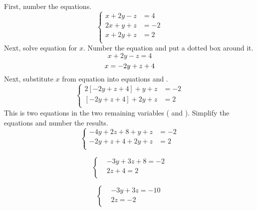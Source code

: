 \noindent
First, number the equations.
\begin{equation*}
    \begin{cases}
        x + 2y - z &= 4 \\ %
        2x + y + z &= -2 \\ %
        x + 2y + z &= 2 \\ %
    \end{cases}
\end{equation*}
Next, solve equation  for $x$.
Number the equation and put a dotted box around it.
\[
    x + 2y - z = 4
\]
\[
    x = -2y + z + 4 \\ %
\]
Next, substitute $x$ from equation  into equations  and .
\begin{equation*}
    \begin{cases}
        2\left[  -2y + z + 4  \right] + y + z &= -2 \\
         \left[  -2y + z + 4  \right] + 2y + z &= 2 \\
    \end{cases}
\end{equation*}
This is two equations in the two remaining variables ( and ).
Simplify the equations and number the results.
\begin{equation*}
    \begin{cases}
        -4y + 2z + 8 + y + z &= -2 \\
        -2y + z + 4 + 2y + z &= 2 \\
    \end{cases}
\end{equation*}

\begin{equation*}
    \begin{cases}
        &-3y + 3z + 8 = -2 \\
        &2z + 4 = 2 \\
    \end{cases}
\end{equation*}

\begin{equation*}
    \begin{cases}
        &-3y + 3z = -10 \\
        &2z = -2 \\
    \end{cases}
\end{equation*}

